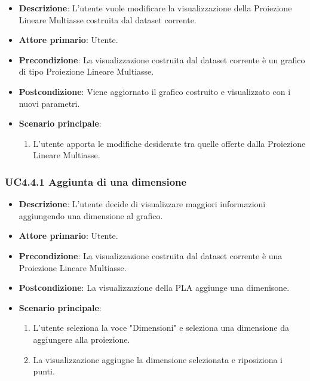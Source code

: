 \begin{itemize}
    \item \textbf{Descrizione}: L’utente vuole modificare la visualizzazione della Proiezione Lineare Multiasse
                                costruita dal dataset corrente.
	
    \item \textbf{Attore primario}: Utente.
    
    \item \textbf{Precondizione}:   La visualizzazione costruita dal dataset corrente è un grafico di tipo Proiezione Lineare Multiasse.
    \item \textbf{Postcondizione}:  Viene aggiornato il grafico costruito e visualizzato con i nuovi parametri.

	\item \textbf{Scenario principale}:
		\begin{enumerate}
            \item L'utente apporta le modifiche desiderate tra quelle offerte dalla Proiezione Lineare Multiasse.
        \end{enumerate}
\end{itemize}

\subsubsection{UC4.4.1 Aggiunta di una dimensione}
\label{subsec:uc4.2.1}
\begin{itemize}
    \item \textbf{Descrizione}: L’utente decide di visualizzare maggiori informazioni
                                aggiungendo una dimensione al grafico.

    \item \textbf{Attore primario}: Utente.
    
    \item \textbf{Precondizione}:   La visualizzazione costruita dal dataset corrente è una Proiezione Lineare Multiasse.
    \item \textbf{Postcondizione}:  La visualizzazione della PLA aggiunge una dimenisone.

	\item \textbf{Scenario principale}:
        \begin{enumerate}
            \item L'utente seleziona la voce "Dimensioni" e seleziona una dimensione da aggiungere alla proiezione.
            \item La visualizzazione aggiugne la dimensione selezionata e riposiziona i punti.
           
        \end{enumerate}
\end{itemize}

